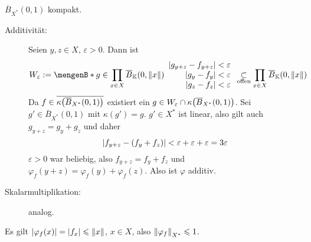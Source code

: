 $\overline{B}_{X^*}(0,1)$ kompakt.
\begin{description}
	\item[Additivität:] Seien $y,z \in X$, $\varepsilon>0$. Dann ist 
	\[
		W_\varepsilon := \set[g \in \prod_{x \in X} \overline{B}_\mathds{K}(0, \norm{x} ) ]{\begin{array}{r}
			\abs*{g_{y+z}- f_{y+z}} < \varepsilon \\ \enspace\abs*{g_y-f_y} < \varepsilon \\ \enspace\abs*{g_z -f_z}  < \varepsilon
		\end{array}  }  
		\underset{\text{offen}}{\subset} \prod_{x \in X} \overline{B}_\mathds{K}(0,\norm{x}) 
	\]
	Da $f \in \overline{\kappa \enbrace*{\overline{B}_{X^*}(0,1)}}$ existiert ein $ g \in W_\varepsilon \cap \kappa \enbrace*{\overline{B}_{X^*}(0,1)}$. Sei 
	$g' \in \overline{B}_{X^*}(0,1)$ mit $\kappa(g')=g$. $g' \in X^*$ ist linear, also gilt auch $g_{y+z}= g_y + g_z$ und daher 
	\[
		\abs*{f_{y+z} - (f_y + f_z)} < \varepsilon + \varepsilon + \varepsilon= 3 \varepsilon
	\]
	$\varepsilon>0$ war beliebig, also $f_{y+z}= f_y+f_z$ und $\varphi_f(y+z)= \varphi_f(y)+ \varphi_f(z)$. Also ist $\varphi$ additiv.
	\item[Skalarmultiplikation:] analog.
\end{description}
Es gilt $\abs*{\varphi_f(x)} = \abs*{f_x} \le \norm{x}$, $x \in X$, also $\norm[X^*]{\varphi_f} \le 1$. \bewende

